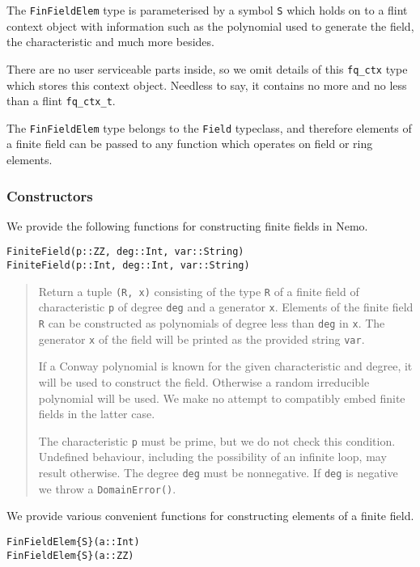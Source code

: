 \documentclass[a4paper,10pt]{article}
\newcommand{\code}{\lstinline}
\newcommand{\desc}[1]{\vspace{-3mm}\begin{quote}#1\end{quote}}
\begin{document}
{{The \code{FinFieldElem} type is parameterised by a symbol \code{S} which holds
on to a flint context object with information such as the polynomial used to
generate the field, the characteristic and much more besides.

There are no user serviceable parts inside, so we omit details of this 
\code{fq_ctx} type which stores this context object. Needless to say, it
contains no more and no less than a flint \code{fq_ctx_t}.

The \code{FinFieldElem} type belongs to the \code{Field} typeclass, and
therefore elements of a finite field can be passed to any function which
operates on field or ring elements.

\subsubsection{Constructors}

We provide the following functions for constructing finite fields in Nemo.

\begin{lstlisting}
FiniteField(p::ZZ, deg::Int, var::String)
FiniteField(p::Int, deg::Int, var::String)
\end{lstlisting}

\desc{Return a tuple \code{(R, x)} consisting of the type \code{R} of a finite
field of characteristic \code{p} of degree \code{deg} and a generator \code{x}.
Elements of the finite field \code{R} can be constructed as polynomials of
degree less than \code{deg} in \code{x}. The generator \code{x} of the field 
will be printed as the provided string \code{var}.

If a Conway polynomial is known for the given characteristic and degree, it
will be used to construct the field. Otherwise a random irreducible polynomial
will be used. We make no attempt to compatibly embed finite fields in the
latter case.

The characteristic \code{p} must be prime, but we do not check this condition.
Undefined behaviour, including the possibility of an infinite loop, may result
otherwise. The degree \code{deg} must be nonnegative. If \code{deg} is 
negative we throw a \code{DomainError()}.}

We provide various convenient functions for constructing elements of a finite
field.

\begin{lstlisting}
FinFieldElem{S}(a::Int)
FinFieldElem{S}(a::ZZ)
\end{lstlisting}

}}
\end{document}

